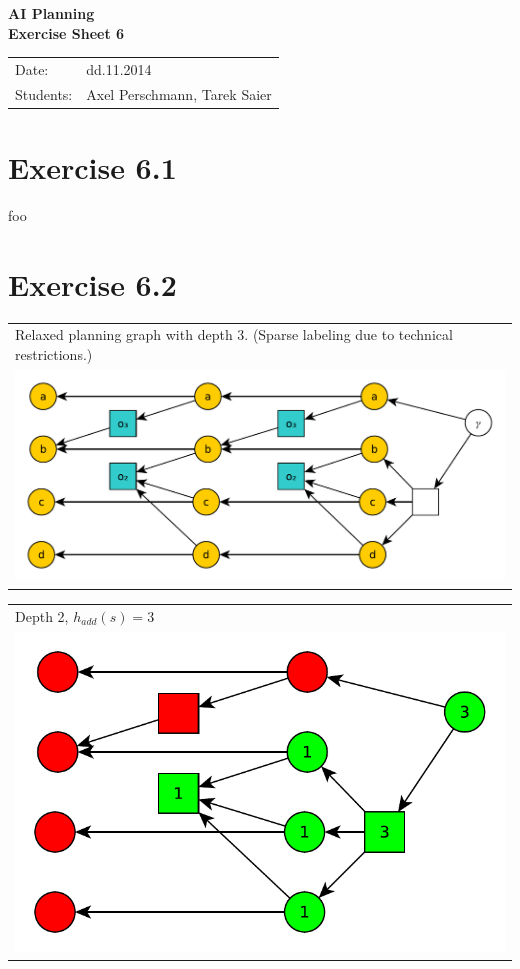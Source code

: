 \documentclass[11pt,a4paper]{article}
\begin{document}
\begin{center}
\Huge{\textbf{AI Planning}}\\
\LARGE{\textbf{Exercise Sheet 6}}
\end{center}
\vspace{2cm}
\begin{tabular}{ll}
Date: & dd.11.2014\\
Students: & Axel Perschmann, Tarek Saier
\end{tabular}

\section*{Exercise 6.1}
foo

\section*{Exercise 6.2}
\begin{tabular}{l} %
Relaxed planning graph with depth 3. (Sparse labeling due to technical restrictions.)\\
\includegraphics[scale=0.5]{g62}\\
\end{tabular}

\begin{tabular}{l} %
Depth 2, $h_{add}(s)=3$\\
\includegraphics[scale=0.5]{g622}\\
\end{tabular}
\end{document}
